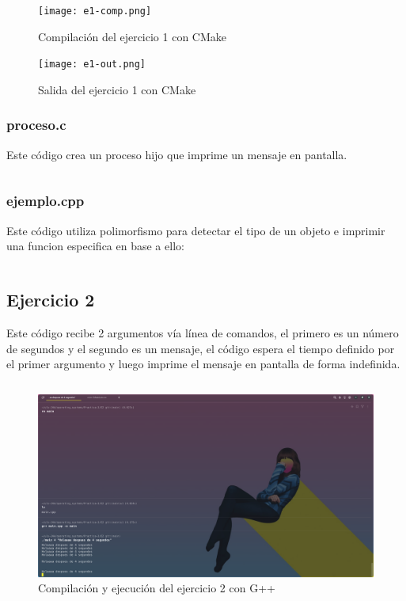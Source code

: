 \documentclass[]{article}
\newenvironment{code}{\captionsetup{type=listing}}{}
\begin{document}
\begin{figure}[h]
\caption{Compilación del ejercicio 1 con CMake}
\centering
\texttt{[image: e1-comp.png]}  
\end{figure}

\begin{figure}[h]
\caption{Salida del ejercicio 1 con CMake}
\centering
\texttt{[image: e1-out.png]}  
\end{figure}

\subsubsection*{proceso.c}
Este código crea un proceso hijo que imprime un mensaje en pantalla.
\begin{code}
	\inputminted{c}{../E1/proceso.c}
\end{code}


\subsubsection*{ejemplo.cpp}
Este código utiliza polimorfismo para detectar el tipo de un objeto e imprimir
una funcion especifica en base a ello:
\begin{code}
	\inputminted{c}{../E1/ejemplo.cpp}
\end{code}



\subsection{Ejercicio 2}
Este código recibe 2 argumentos vía línea de comandos, el primero es un 
número de segundos y el segundo es un mensaje, el código espera el tiempo
definido por el primer argumento y luego imprime el mensaje en pantalla 
de forma indefinida.
\begin{code}
	\inputminted{cpp}{../E2/main.cpp}
\end{code}

\begin{figure}[h]
\caption{Compilación y ejecución del ejercicio 2 con G++}
\centering
\includegraphics[scale=0.4,trim={0 0 20cm 20cm},clip]{e2-out.png}  
\end{figure}
\end{document}
